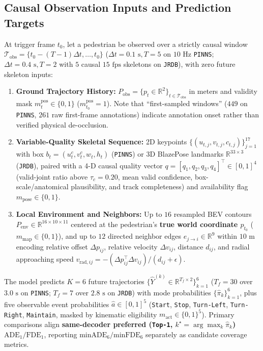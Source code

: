 \documentclass[journal]{IEEEtran}
\begin{document}
\subsection{Causal Observation Inputs and Prediction Targets}
At trigger frame $t_0$, let a pedestrian be observed over a strictly causal window $\mathcal{T}_{\text{obs}} = \{t_0 - (T-1)\Delta t, \dots, t_0\}$ ($\Delta t = 0.1\text{ s}, T = 5$ on $10\text{ Hz}$ \texttt{PINNS}; $\Delta t = 0.4\text{ s}, T = 2$ with $5$ causal $15\text{ fps}$ skeletons on \texttt{JRDB}), with zero future skeleton inputs:
\begin{enumerate}
  \item \textbf{Ground Trajectory History:} $P_{\text{obs}} = \{p_t \in \mathbb{R}^2\}_{t \in \mathcal{T}_{\text{obs}}}$ in meters and validity mask $m^{\text{pos}}_t \in \{0, 1\}$ ($m^{\text{pos}}_{t_0} = 1$). Note that ``first-sampled windows'' ($449$ on \texttt{PINNS}, $261$ raw first-frame annotations) indicate annotation onset rather than verified physical de-occlusion.
  \item \textbf{Variable-Quality Skeletal Sequence:} 2D keypoints $\{(u_{t,j}, v_{t,j}, c_{t,j})\}_{j=1}^{17}$ with box $b_t = (u^c_t, v^c_t, w_t, h_t)$ (\texttt{PINNS}) or 3D BlazePose landmarks $\mathbb{R}^{33\times 3}$ (\texttt{JRDB}), paired with a 4-D causal quality vector $q = [q_1, q_2, q_3, q_4]^\top \in [0, 1]^4$ (valid-joint ratio above $\tau_c = 0.20$, mean valid confidence, box-scale/anatomical plausibility, and track completeness) and availability flag $m_{\text{pose}} \in \{0, 1\}$.
  \item \textbf{Local Environment and Neighbors:} Up to $16$ resampled BEV contours $P_{\text{env}} \in \mathbb{R}^{16\times 10\times 11}$ centered at the pedestrian's \textbf{true world coordinate $p_{t_0}$} ($m_{\text{map}} \in \{0, 1\}$), and up to $12$ directed neighbor edges $e_{j\to i} \in \mathbb{R}^9$ within $10\text{ m}$ encoding relative offset $\Delta p_{ij}$, relative velocity $\Delta v_{ij}$, distance $d_{ij}$, and radial approaching speed $v_{\text{rad}, ij} = -(\Delta p_{ij}^\top \Delta v_{ij}) / (d_{ij} + \epsilon)$.
\end{enumerate}

The model predicts $K = 6$ future trajectories $\{\hat{Y}^{(k)} \in \mathbb{R}^{T_f \times 2}\}_{k=1}^6$ ($T_f = 30$ over $3.0\text{ s}$ on \texttt{PINNS}; $T_f = 7$ over $2.8\text{ s}$ on \texttt{JRDB}) with mode probabilities $\{\hat{\pi}_k\}_{k=1}^6$, plus five observable event probabilities $\hat{a} \in [0, 1]^5$ (\texttt{Start}, \texttt{Stop}, \texttt{Turn-Left}, \texttt{Turn-Right}, \texttt{Maintain}, masked by kinematic eligibility $m_{\text{act}} \in \{0, 1\}^5$). Primary comparisons align \textbf{same-decoder preferred (\texttt{Top-1}, $k^\star = \arg\max_k \hat{\pi}_k$) $\text{ADE}_1 / \text{FDE}_1$}, reporting $\text{minADE}_6 / \text{minFDE}_6$ separately as candidate coverage metrics.
\end{document}
